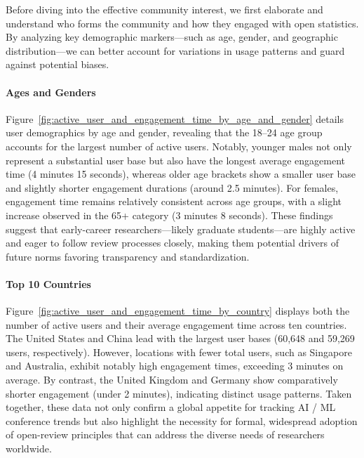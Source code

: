 Before diving into the effective community interest, we first elaborate and understand who forms the community and how they engaged with open statistics. By analyzing key demographic markers—such as age, gender, and geographic distribution—we can better account for variations in usage patterns and guard against potential biases.


\paragraph{Ages and Genders}
Figure~\ref{fig:active_user_and_engagement_time_by_age_and_gender} details user demographics by age and gender, revealing that the 18--24 age group accounts for the largest number of active users. Notably, younger males not only represent a substantial user base but also have the longest average engagement time (4 minutes 15 seconds), whereas older age brackets show a smaller user base and slightly shorter engagement durations (around 2.5 minutes). For females, engagement time remains relatively consistent across age groups, with a slight increase observed in the 65+ category (3 minutes 8 seconds). These findings suggest that early-career researchers—likely graduate students—are highly active and eager to follow review processes closely, making them potential drivers of future norms favoring transparency and standardization.

\paragraph{Top 10 Countries}
Figure~\ref{fig:active_user_and_engagement_time_by_country} displays both the number of active users and their average engagement time across ten countries. The United States and China lead with the largest user bases (60,648 and 59,269 users, respectively). However, locations with fewer total users, such as Singapore and Australia, exhibit notably high engagement times, exceeding 3 minutes on average. By contrast, the United Kingdom and Germany show comparatively shorter engagement (under 2 minutes), indicating distinct usage patterns. Taken together, these data not only confirm a global appetite for tracking AI / ML conference trends but also highlight the necessity for formal, widespread adoption of open-review principles that can address the diverse needs of researchers worldwide.

